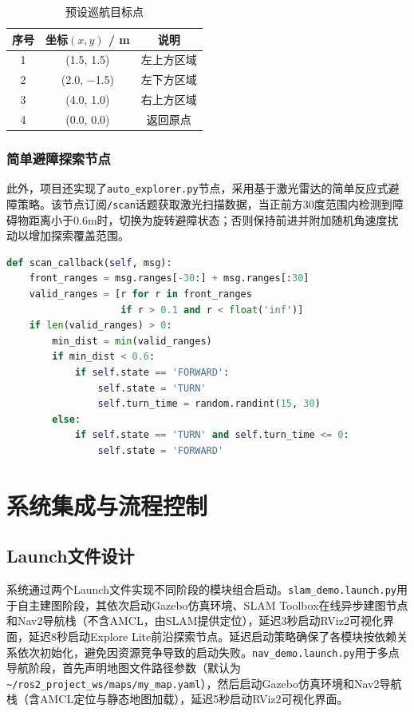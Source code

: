 \documentclass[a4paper,12pt]{article}
\begin{document}
\begin{table}[H]
\centering
\caption{预设巡航目标点}
\label{tab:waypoints}
\begin{tabular}{ccc}
\toprule
序号 & 坐标$(x, y)$ / m & 说明 \\
\midrule
1 & (1.5, 1.5) & 左上方区域 \\
2 & (2.0, $-$1.5) & 左下方区域 \\
3 & (4.0, 1.0) & 右上方区域 \\
4 & (0.0, 0.0) & 返回原点 \\
\bottomrule
\end{tabular}
\end{table}

\subsubsection{简单避障探索节点}

此外，项目还实现了\texttt{auto\_explorer.py}节点，采用基于激光雷达的简单反应式避障策略。该节点订阅\texttt{/scan}话题获取激光扫描数据，当正前方30度范围内检测到障碍物距离小于0.6m时，切换为旋转避障状态；否则保持前进并附加随机角速度扰动以增加探索覆盖范围。

\begin{lstlisting}[language=Python,title={简单避障探索代码（auto\_explorer.py）}]
def scan_callback(self, msg):
    front_ranges = msg.ranges[-30:] + msg.ranges[:30]
    valid_ranges = [r for r in front_ranges
                    if r > 0.1 and r < float('inf')]
    if len(valid_ranges) > 0:
        min_dist = min(valid_ranges)
        if min_dist < 0.6:
            if self.state == 'FORWARD':
                self.state = 'TURN'
                self.turn_time = random.randint(15, 30)
        else:
            if self.state == 'TURN' and self.turn_time <= 0:
                self.state = 'FORWARD'
\end{lstlisting}

\section{系统集成与流程控制}

\subsection{Launch文件设计}

系统通过两个Launch文件实现不同阶段的模块组合启动。\texttt{slam\_demo.launch.py}用于自主建图阶段，其依次启动Gazebo仿真环境、SLAM Toolbox在线异步建图节点和Nav2导航栈（不含AMCL，由SLAM提供定位），延迟3秒启动RViz2可视化界面，延迟8秒启动Explore Lite前沿探索节点。延迟启动策略确保了各模块按依赖关系依次初始化，避免因资源竞争导致的启动失败。\texttt{nav\_demo.launch.py}用于多点导航阶段，首先声明地图文件路径参数（默认为\texttt{\textasciitilde/ros2\_project\_ws/maps/my\_map.yaml}），然后启动Gazebo仿真环境和Nav2导航栈（含AMCL定位与静态地图加载），延迟5秒启动RViz2可视化界面。
\end{document}
